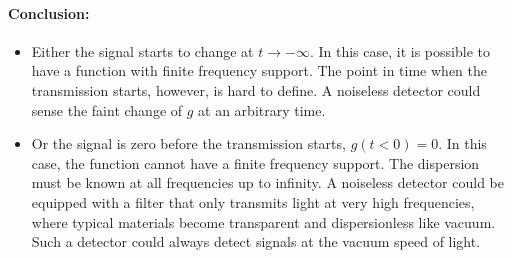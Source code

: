 \documentclass[12pt,a4paper,twoside,openright,BCOR10mm,headsepline,titlepage,abstracton,chapterprefix,final]{scrreprt}
\begin{document}
\paragraph{Conclusion:}
\begin{itemize}
 \item Either the signal starts to change at $t\rightarrow-\infty$.
       In this case, it is possible to have a function with finite frequency support.
       The point in time when the transmission starts, however, is hard to define.
       A noiseless detector could sense the faint change of $g$ at an arbitrary time.
 \item Or the signal is zero before the transmission starts, $g(t<0)=0$.
       In this case, the function cannot have a finite frequency support.
       The dispersion must be known at all frequencies up to infinity.
       A noiseless detector could be equipped with a filter that only transmits light at very high frequencies,
       where typical materials become transparent and dispersionless like vacuum.
       Such a detector could always detect signals at the vacuum speed of light.
\end{itemize}
\end{document}
